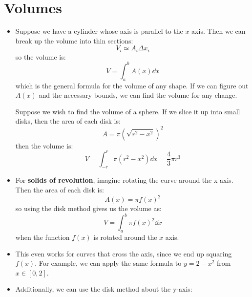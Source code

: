 \section{Volumes}
\begin{itemize}
    \item Suppose we have a cylinder whose axis is parallel to the $x$ axis. Then we can break up the volume into thin sections:
    \begin{equation}
        V_i \simeq A_i \Delta x_i 
        \label{eq:}
    \end{equation}
    so the volume is:
    \begin{equation}
        V = \int_a^b A(x) \dd{x}
        \label{eq:}
    \end{equation}
    which is the general formula for the volume of any shape. If we can figure out $A(x)$ and the necessary bounds, we can find the volume for any change.
    \begin{example}
        Suppose we wish to find the volume of a sphere. If we slice it up into small disks, then the area of each disk is:
        \begin{equation}
            A=\pi\left(\sqrt{r^2-x^2}\right)^2
            \label{eq:}
        \end{equation}
        then the volume is:
        \begin{equation}
            V=\int_{-r}^r \pi (r^2-x^2)\dd{x} = \frac{4}{3}\pi r^3
            \label{eq:}
        \end{equation}
    \end{example}
    \item For \textbf{solids of revolution}, imagine rotating the curve around the x-axis. Then the area of each disk is:
    \begin{equation}
        A(x) = \pi f(x)^2
        \label{eq:}
    \end{equation}
    so using the disk method gives us the volume as:
    \begin{equation}
        V = \int_a^b \pi f(x)^2 \dd{x}
        \label{eq:}
    \end{equation}
    when the function $f(x)$ is rotated around the $x$ axis.
    \item This even works for curves that cross the axis, since we end up squaring $f(x)$. For example, we can apply the same formula to $y=2-x^2$ from $x\in[0,2]$.
    \item Additionally, we can use the disk method about the y-axis:
    \begin{equation}

\end{equation}
\end{itemize}
